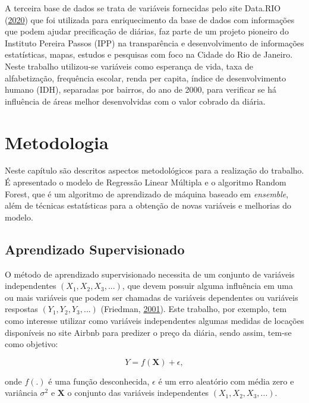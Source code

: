 \documentclass[
	12pt,				%
	a4paper,		%
	oneside,    %
	chapter=TITLE,		   %
	section=TITLE,		   %
	subsection=TITLE,	   %
	subsubsection=TITLE, %
	english,			%
	french,				%
	spanish,			%
	brazil,				%
]{abntex2}
\begin{document}
A terceira base de dados se trata de variáveis fornecidas pelo site
Data.RIO (\protect\hyperlink{ref-datario}{2020}) que foi utilizada para
enriquecimento da base de dados com informações que podem ajudar
precificação de diárias, faz parte de um projeto pioneiro do Instituto
Pereira Passos (IPP) na transparência e desenvolvimento de informações
estatísticas, mapas, estudos e pesquisas com foco na Cidade do Rio de
Janeiro. Neste trabalho utilizou-se variáveis como esperança de vida,
taxa de alfabetização, frequência escolar, renda per capita, índice de
desenvolvimento humano (IDH), separadas por bairros, do ano de 2000,
para verificar se há influência de áreas melhor desenvolvidas com o
valor cobrado da diária.

\hypertarget{metodologia}{%
\chapter{Metodologia}\label{metodologia}}

Neste capítulo são descritos aspectos metodológicos para a realização do
trabalho. É apresentado o modelo de Regressão Linear Múltipla e o
algoritmo Random Forest, que é um algoritmo de aprendizado de máquina
baseado em \emph{ensemble}, além de técnicas estatísticas para a
obtenção de novas variáveis e melhorias do modelo.

\hypertarget{aprendizado-supervisionado}{%
\section{Aprendizado Supervisionado}\label{aprendizado-supervisionado}}

O método de aprendizado supervisionado necessita de um conjunto de
variáveis independentes \((X_1, X_2, X_3, ...)\), que devem possuir
alguma influência em uma ou mais variáveis que podem ser chamadas de
variáveis dependentes ou variáveis respostas \((Y_1,Y_2,Y_3,...)\)
(Friedman, \protect\hyperlink{ref-friedman2001elements}{2001}). Este
trabalho, por exemplo, tem como interesse utilizar como variáveis
independentes algumas medidas de locações disponíveis no site Airbnb
para predizer o preço da diária, sendo assim, tem-se como objetivo:

\[
Y = f(\boldsymbol{X}) + \epsilon,
\]

\noindent onde \(f(.)\) é uma função desconhecida, \(\epsilon\) é um
erro aleatório com média zero e variância \(\sigma^2\) e
\(\boldsymbol{X}\) o conjunto das variáveis independentes
\((X_1, X_2, X_3, ...)\).
\end{document}
